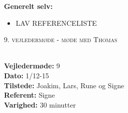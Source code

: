 \documentclass[a4paper,11pt,oneside]{memoir}
\begin{document}
\textbf{Generelt selv:}
\begin{itemize}
\item LAV REFERENCELISTE
\end{itemize}


\newpage


\begin{center} 
\huge{\textsc{9. vejledermøde - møde med Thomas}}
\end{center}

\textbf{ }
\\
\textbf{Vejledermøde:} 9
\\
\textbf{Dato:} 1/12-15
\\
\textbf{Tilstede:} Joakim, Lars, Rune og Signe
\\
\textbf{Referent:} Signe
\\
\textbf{Varighed:} 30 minutter
\\
\end{document}
